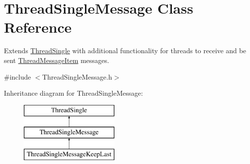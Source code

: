 \hypertarget{class_thread_single_message}{
\section{ThreadSingleMessage Class Reference}
\label{class_thread_single_message}
}


Extends \hyperlink{class_thread_single}{ThreadSingle} with additional functionality for threads to receive and be sent \hyperlink{class_thread_message_item}{ThreadMessageItem} messages.  




{\ttfamily \#include $<$ThreadSingleMessage.h$>$}

Inheritance diagram for ThreadSingleMessage:\begin{figure}[H]
\begin{center}
\leavevmode
\includegraphics[height=3.000000cm]{class_thread_single_message}
\end{center}
\end{figure}
